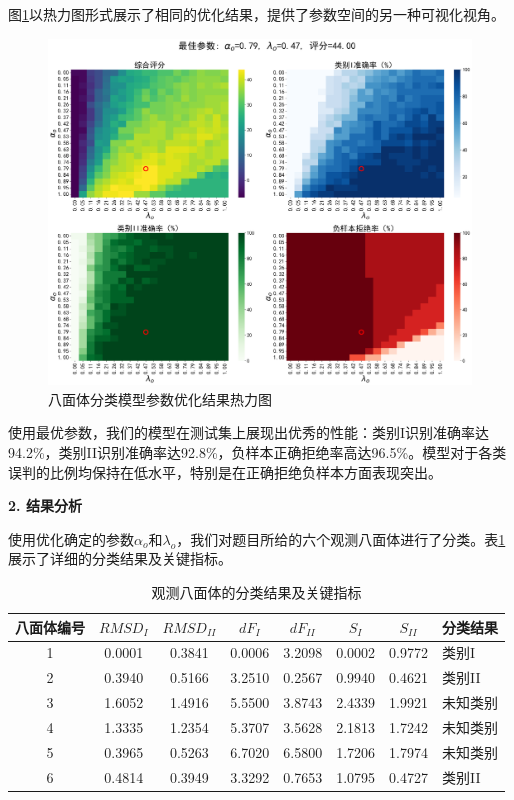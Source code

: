 图\ref{fig:param_optimization_heatmap}以热力图形式展示了相同的优化结果，提供了参数空间的另一种可视化视角。
    
    \begin{figure}[H]
        \centering
    \includegraphics[width=1\textwidth]{figures2/params/octahedron_parameter_optimization_heatmaps.png}
    \caption{八面体分类模型参数优化结果热力图}
    \label{fig:param_optimization_heatmap}
    \end{figure}
    
使用最优参数，我们的模型在测试集上展现出优秀的性能：类别I识别准确率达94.2\%，类别II识别准确率达92.8\%，负样本正确拒绝率高达96.5\%。模型对于各类误判的比例均保持在低水平，特别是在正确拒绝负样本方面表现突出。
    
\textbf{2. 结果分析}

使用优化确定的参数$\alpha_o$和$\lambda_o$，我们对题目所给的六个观测八面体进行了分类。表\ref{tab:octahedron_classification_results}展示了详细的分类结果及关键指标。
    
    \begin{table}[H]
        \centering
\caption{观测八面体的分类结果及关键指标}
\label{tab:octahedron_classification_results}
\begin{tabular}{cccccccl}
        \toprule
八面体编号 & $RMSD_I$ & $RMSD_{II}$ & $dF_I$ & $dF_{II}$ & $S_I$ & $S_{II}$ & 分类结果 \\
        \midrule
1 & 0.0001 & 0.3841 & 0.0006 & 3.2098 & 0.0002 & 0.9772 & 类别I \\
2 & 0.3940 & 0.5166 & 3.2510 & 0.2567 & 0.9940 & 0.4621 & 类别II \\
3 & 1.6052 & 1.4916 & 5.5500 & 3.8743 & 2.4339 & 1.9921 & 未知类别 \\
4 & 1.3335 & 1.2354 & 5.3707 & 3.5628 & 2.1813 & 1.7242 & 未知类别 \\
5 & 0.3965 & 0.5263 & 6.7020 & 6.5800 & 1.7206 & 1.7974 & 未知类别 \\
6 & 0.4814 & 0.3949 & 3.3292 & 0.7653 & 1.0795 & 0.4727 & 类别II \\
        \bottomrule
        \end{tabular}
    \end{table}
    
